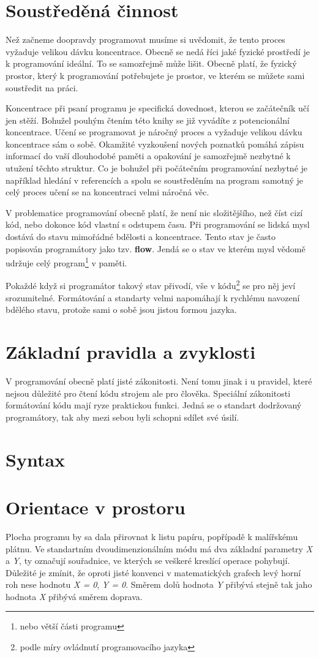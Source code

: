 \documentclass[10pt,twopage]{book}
\newcommand{\oddil}[1]{\section{#1}\label{sec:#1}}
\newcommand{\slovnik}[1]{\textbf{\gls{#1}}\index{#1}}
\begin{document}
\oddil{Soustředěná činnost}

Než začneme doopravdy programovat musíme si uvědomit, že tento proces vyžaduje velikou dávku koncentrace. Obecně se nedá říci jaké fyzické prostředí je k programování ideální. To se samozřejmě může lišit. Obecně platí, že fyzický prostor, který k programování potřebujete je prostor, ve kterém se můžete sami soustředit na práci.

Koncentrace při psaní programu je specifická dovednost, kterou se začátečník učí jen stěží. Bohužel pouhým čtením této knihy se již vyvádíte z potencionální koncentrace. Učení se programovat je náročný proces a vyžaduje velikou dávku koncentrace sám o sobě. Okamžité vyzkoušení nových poznatků pomáhá zápisu informací do vaší dlouhodobé paměti a opakování je samozřejmě nezbytné k utužení těchto struktur. Co je bohužel při počátečním programování nezbytné je například hledání v referencích a spolu se soustředěním na program samotný je celý proces učení se na koncentraci velmi náročná věc.



V problematice programování obecně platí, že není nic složitějšího, než číst cizí kód, nebo dokonce kód vlastní s odstupem času. Při programování se lidská mysl dostává do stavu mimořádné bdělosti a koncentrace. Tento stav je často popisován programátory jako tzv. \slovnik{flow}. Jendá se o stav ve kterém mysl vědomě udržuje celý program\footnote{nebo větší části programu} v paměti.

Pokaždé když si programátor takový stav přivodí, vše v kódu\footnote{podle míry ovládnutí programovacího jazyka} se pro něj jeví srozumitelné. Formátování a standarty velmi napomáhají k rychlému navození bdělého stavu, protože sami o sobě jsou jistou formou jazyka.

\oddil{Základní pravidla a zvyklosti}

V programování obecně platí jisté zákonitosti. Není tomu jinak i u pravidel, které nejsou důležité pro čtení kódu strojem ale pro člověka. Speciální zákonitosti formátování kódu mají ryze praktickou funkci. Jedná se o standart dodržovaný programátory, tak aby mezi sebou byli schopni sdílet své úsilí.


\oddil{Syntax}


\oddil{Orientace v prostoru}

Plocha programu by sa dala přirovnat k listu papíru, popřípadě k malířskému plátnu. Ve standartním dvoudimenzionálním módu má dva základní parametry {\em X} a {\em Y}, ty označují souřadnice, ve kterých se veškeré kreslící operace pohybují. Důležité je zmínit, že oproti jisté konvenci v matematických grafech levý horní roh nese hodnotu {\em X = 0}, {\em Y = 0}. Směrem dolů hodnota {\em Y} přibývá stejně tak jaho hodnota {\em X} přibývá směrem doprava.\\
\end{document}
